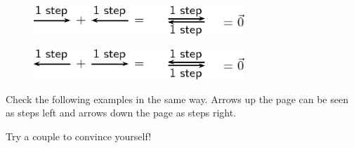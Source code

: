     \setcounter{subfigure}{0}


	\begin{figure}[H] %
    \begin{center}
    \label{m38813*id186710!!!underscore!!!media}\label{m38813*id186710!!!underscore!!!printimage}\includegraphics[width=300px]{col11305.imgs/m38813_PG11C1_016.png} %
        
      \vspace{2pt}
    \vspace{.1in}
    
    \end{center}

 \end{figure}   

    \addtocounter{footnote}{-0}
    
        \par 
        \label{m38813*id186716}
          
    \setcounter{subfigure}{0}


	\begin{figure}[H] %
    \begin{center}
    \label{m38813*id188625!!!underscore!!!media}\label{m38813*id188625!!!underscore!!!printimage}\includegraphics[width=300px]{col11305.imgs/m38813_PG11C1_017.png} %
        
      \vspace{2pt}
    \vspace{.1in}
    
    \end{center}

 \end{figure}   

    \addtocounter{footnote}{-0}
    
        \par 
        \label{m38813*id188632}Check the following examples in the same way. Arrows up the page can be
seen as steps left and arrows down the page as steps right.\par 
        \label{m38813*id188636}Try a couple to convince yourself!\par 
        
